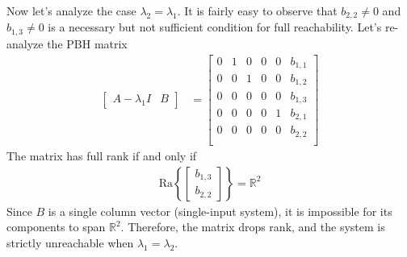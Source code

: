 \documentclass[twoside]{article}
\begin{document}
Now let's analyze the case $\lambda_2 = \lambda_1$. It is fairly easy 
to observe that $b_{2,2} \neq 0$ and $b_{1,3} \neq 0$ is a necessary
but not sufficient condition for full reachability. Let's re-analyze the
PBH matrix
%
\begin{align*}
  \left[ \begin{array}{c|c} A - \lambda_1 I & B \end{array} \right]
  &= \left[  \begin{array}{ccc|cc|c} 0 & 1 & 0 & 0 & 0 & b_{1,1} \\
     0 & 0 & 1 & 0 & 0 & b_{1,2}
    \\
    0 & 0 & 0 &  0 & 0 & b_{1,3 }\\
    \hline
    0 & 0 & 0 & 0 & 1 & b_{2,1} \\
    0 & 0 & 0 & 0 & 0 & b_{2,2}   \\
    \end{array} \right]
\end{align*}
%
The matrix has full rank if and only if 
%
\begin{align*}
 \mathrm{Ra}\left\lbrace 
 \begin{bmatrix}
     b_{1,3}
     \\
     b_{2,2}
 \end{bmatrix}
 \right\rbrace = \mathbb{R}^2
\end{align*}
%
Since $B$ is a single column vector (single-input system), it is impossible for its components to span $\mathbb{R}^2$. Therefore, the matrix drops rank, and the system is strictly unreachable when $\lambda_1 = \lambda_2$.
\end{document}
